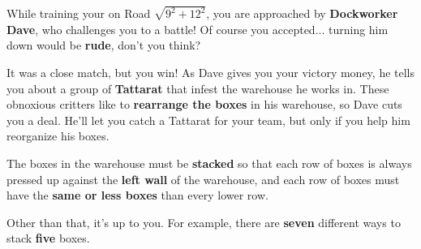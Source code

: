 

\newcommand{\mappBoxRow}[2]{
  \fill[color=lightgray] #1 rectangle #2;
  \draw[step=1]          #1 grid #2;
}


While training your \mappMobimon{} on Road \(\sqrt{9^2+12^2}\), you are
approached
by \textbf{Dockworker Dave}, who challenges you to a \mappMobimon{} battle!
Of course you accepted... turning him down would be \textbf{rude},
don't you think?

It was a close match, but you win! As Dave gives you your victory money, he
tells you about a group of \textbf{Tattarat} \mappMobimon{} that infest the
warehouse he works in. These obnoxious critters like to
\textbf{rearrange the boxes} in his warehouse, so Dave cuts you a deal.
He'll let you catch a Tattarat for your team, but only if you help
him reorganize his boxes.

The boxes in the warehouse must be \textbf{stacked} so that
each row of boxes is always pressed up against the \textbf{left wall} of the
warehouse, and each row of boxes must have the \textbf{same or less boxes} than
every lower row.

Other than that, it's up to you. For example, there are \textbf{seven}
different ways to stack \textbf{five} boxes.

